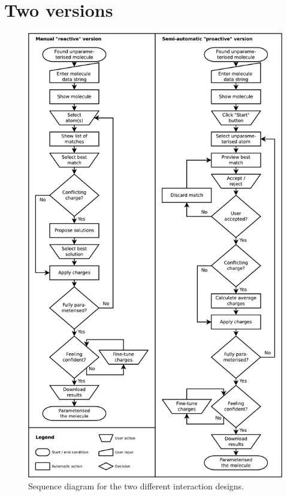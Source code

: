 \section{Two versions}

\begin{figure}[h!]
\begin{center}
\includegraphics[width=.9\textwidth]{img/complete_id.pdf}
\caption{Sequence diagram for the two different interaction designs.}
\vspace{-2cm}
\end{center}
\end{figure}

